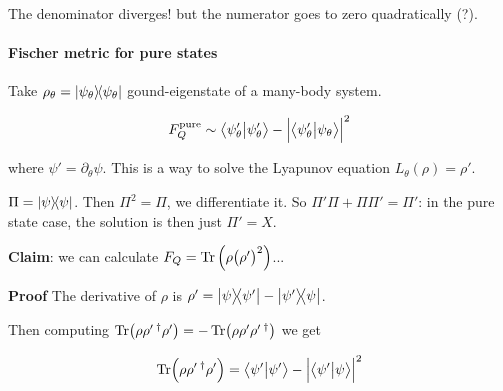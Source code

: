 The denominator diverges! but the numerator goes to zero quadratically (?).

\paragraph{Fischer metric for pure states}

Take \( \rho_\theta = \ketbra{\psi_\theta} \) gound-eigenstate of a many-body system.

\begin{equation}
  F_Q ^{\text{pure}} \sim \braket{\psi_\theta'}{\psi_\theta'} - \abs{\braket{\psi_\theta'}{\psi_\theta}}^2
\end{equation}

where \( \psi' = \partial_\theta \psi \). This is a way to solve the Lyapunov equation \( L_\theta (\rho) = \rho' \).

\( \Pi = \ketbra{\psi} \). Then \(\Pi ^2 = \Pi\), we differentiate it.
So \( \Pi' \Pi + \Pi \Pi' = \Pi' \): in the pure state case, the solution is then just \( \Pi ' = X \).

\textbf{Claim}: we can calculate  \( F_Q =  \Tr \qty(\rho \qty(\rho')^2)\)...

\begin{greenbox}
  \textbf{Proof}
  The derivative of \( \rho \) is \( \rho' = \ketbra{\psi}{\psi'} - \ketbra{\psi'}{\psi} \).

  Then computing \( \Tr(\rho \rho'\, ^\dag \rho') = - \Tr(\rho \rho' \rho'\, ^\dag)\) we get

  \begin{equation}
    \Tr(\rho \rho'\, ^\dag \rho') = \braket{\psi'}{\psi'} - \abs{\braket{\psi'}{\psi}}^2
  \end{equation}
\end{greenbox}

